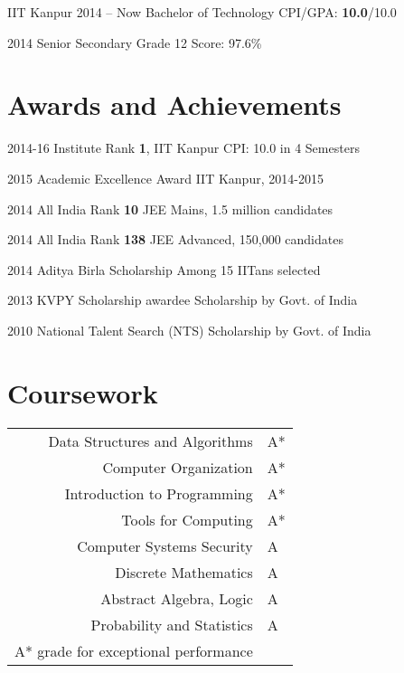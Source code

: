 \documentclass{tccv}
\begin{document}
\begin{yearlist}

\item[IIT Kanpur]{\small{2014 -- Now}}
  {Bachelor of Technology}
  {CPI/GPA: \textbf{10.0}/10.0}

\item[]{\small{2014}}
  {Senior Secondary Grade 12}
  {Score: 97.6\%}

\end{yearlist}

\vspace{-0.7cm}
\section{Awards and Achievements}

\begin{yearlist}

\item{\small{2014-16}}
  {Institute Rank \textbf{1}, IIT Kanpur}
  {\small{CPI: 10.0 in 4 Semesters}}

\item{\small{2015}}
  {Academic Excellence Award}
  {\small{IIT Kanpur, 2014-2015}}

\item{\small{2014}}
  {All India Rank \textbf{10}}
  {\small{JEE Mains, 1.5 million candidates}}

\item {\small{2014}}
  {All India Rank \textbf{138}}
  {\small{JEE Advanced, 150,000 candidates}}

\item {\small{2014}}
  {Aditya Birla Scholarship}
  {\small{Among 15 IITans selected}}

\item {\small{2013}}
  {KVPY Scholarship awardee}
  {\small{Scholarship by Govt. of India}}

\item {\small{2010}}
  {National Talent Search (NTS)}
  {\small{Scholarship by Govt. of India}}

\end{yearlist}

\vspace{-0.6cm}
\section{Coursework}
\begin{tabularx}{\linewidth}{ r l }
  Data Structures and Algorithms & A*\\
  Computer Organization & A*\\
  Introduction to Programming & A*\\
  Tools for Computing & A*\\
  Computer Systems Security & A\\
  Discrete Mathematics & A\\
  Abstract Algebra, Logic & A\\
  Probability and Statistics & A\\
  \footnotesize{A* grade for exceptional performance}&\\
\end{tabularx}
\end{document}

